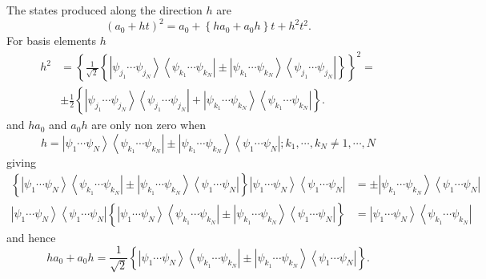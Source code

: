 \documentclass[aps,preprint]{revtex4}%
\begin{document}
The states produced along the direction $h$ are
\begin{equation}
\left(  a_{0}+ht\right)  ^{2}=a_{0}+\left\{  ha_{0}+a_{0}h\right\}
t+h^{2}t^{2}.
\end{equation}
For basis elements $h$
\begin{align}
h^{2}  &  =\left\{  \frac{1}{\sqrt{2}}\left\{  \left\vert \psi_{j_{1}}%
\cdots\psi_{j_{N}}\right\rangle \left\langle \psi_{k_{1}}\cdots\psi_{k_{N}%
}\right\vert \pm\left\vert \psi_{k_{1}}\cdots\psi_{k_{N}}\right\rangle
\left\langle \psi_{j_{1}}\cdots\psi_{j_{N}}\right\vert \right\}  \right\}
^{2}=\nonumber\\
&  \pm\frac{1}{2}\left\{  \left\vert \psi_{j_{1}}\cdots\psi_{j_{N}%
}\right\rangle \left\langle \psi_{j_{1}}\cdots\psi_{j_{N}}\right\vert
+\left\vert \psi_{k_{1}}\cdots\psi_{k_{N}}\right\rangle \left\langle
\psi_{k_{1}}\cdots\psi_{k_{N}}\right\vert \right\}  .
\end{align}
and $ha_{0}$ and $a_{0}h$ are only non zero when
\begin{equation}
h=\left\vert \psi_{1}\cdots\psi_{N}\right\rangle \left\langle \psi_{k_{1}%
}\cdots\psi_{k_{N}}\right\vert \pm\left\vert \psi_{k_{1}}\cdots\psi_{k_{N}%
}\right\rangle \left\langle \psi_{1}\cdots\psi_{N}\right\vert ;k_{1}%
,\cdots,k_{N}\neq1,\cdots,N \label{excit}%
\end{equation}
giving
\begin{align}
\left\{  \left\vert \psi_{1}\cdots\psi_{N}\right\rangle \left\langle
\psi_{k_{1}}\cdots\psi_{k_{N}}\right\vert \pm\left\vert \psi_{k_{1}}\cdots
\psi_{k_{N}}\right\rangle \left\langle \psi_{1}\cdots\psi_{N}\right\vert
\right\}  \left\vert \psi_{1}\cdots\psi_{N}\right\rangle \left\langle \psi
_{1}\cdots\psi_{N}\right\vert  &  =\pm\left\vert \psi_{k_{1}}\cdots\psi
_{k_{N}}\right\rangle \left\langle \psi_{1}\cdots\psi_{N}\right\vert
\nonumber\\
\left\vert \psi_{1}\cdots\psi_{N}\right\rangle \left\langle \psi_{1}\cdots
\psi_{N}\right\vert \left\{  \left\vert \psi_{1}\cdots\psi_{N}\right\rangle
\left\langle \psi_{k_{1}}\cdots\psi_{k_{N}}\right\vert \pm\left\vert
\psi_{k_{1}}\cdots\psi_{k_{N}}\right\rangle \left\langle \psi_{1}\cdots
\psi_{N}\right\vert \right\}   &  =\left\vert \psi_{1}\cdots\psi
_{N}\right\rangle \left\langle \psi_{k_{1}}\cdots\psi_{k_{N}}\right\vert
\end{align}
and hence
\begin{equation}
ha_{0}+a_{0}h=\frac{1}{\sqrt{2}}\left\{  \left\vert \psi_{1}\cdots\psi
_{N}\right\rangle \left\langle \psi_{k_{1}}\cdots\psi_{k_{N}}\right\vert
\pm\left\vert \psi_{k_{1}}\cdots\psi_{k_{N}}\right\rangle \left\langle
\psi_{1}\cdots\psi_{N}\right\vert \right\}  .
\end{equation}
\end{document}
